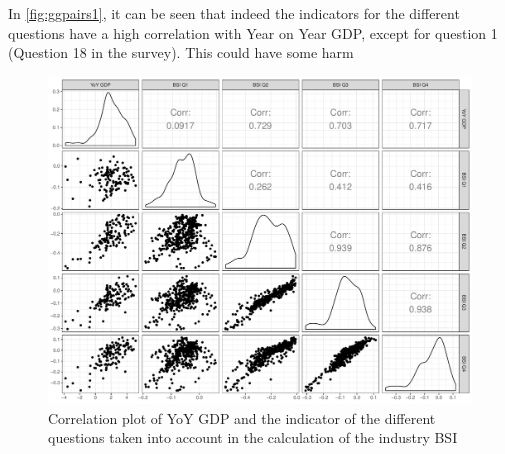 \documentclass{article}[]
\begin{document}
   


In \autoref{fig:ggpairs1}, it can be seen that indeed the indicators for the different questions have a high correlation with Year on Year GDP, except for question 1 (Question 18 in the survey). This could have some harm 

\begin{figure}[!htbp]
    \centering
    \includegraphics[scale=0.4]{Graphs/Corr_GDP_Questions.pdf}
    \caption{Correlation plot of YoY GDP and the indicator of the different questions taken into account in the calculation of the industry BSI}
    \label{fig:ggpairs1}
\end{figure}
\end{document}
